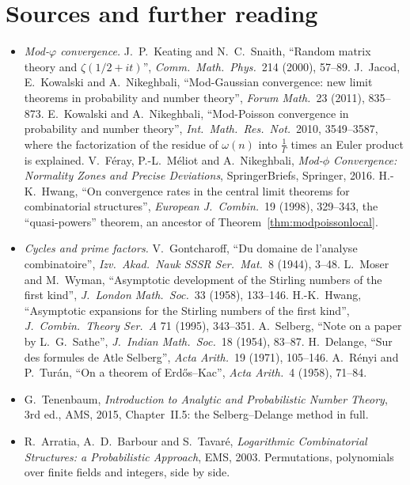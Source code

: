 \section*{Sources and further reading}

\begin{itemize}
\item \emph{Mod-$\varphi$ convergence.} J.~P.~Keating and N.~C.~Snaith, ``Random matrix theory and $\zeta(1/2+it)$'', \emph{Comm.\ Math.\ Phys.}\ 214 (2000), 57--89. J.~Jacod, E.~Kowalski and A.~Nikeghbali, ``Mod-Gaussian convergence: new limit theorems
in probability and number theory'', \emph{Forum Math.}\ 23 (2011), 835--873. E.~Kowalski and A.~Nikeghbali, ``Mod-Poisson convergence in probability and number theory'', \emph{Int.\ Math.\ Res.\ Not.}\ 2010, 3549--3587, where the factorization of the residue
of $\omega(n)$ into $\frac1\Gamma$ times an Euler product is explained. V.~F\'eray, P.-L.~M\'eliot and A.~Nikeghbali, \emph{Mod-$\phi$ Convergence: Normality Zones and Precise Deviations}, SpringerBriefs, Springer, 2016. H.-K.~Hwang, ``On convergence rates in the central limit
theorems for combinatorial structures'', \emph{European J.\ Combin.}\ 19 (1998), 329--343, the ``quasi-powers'' theorem, an ancestor of Theorem~\ref{thm:modpoissonlocal}.
\item \emph{Cycles and prime factors.} V.~Gontcharoff, ``Du domaine de l'analyse combinatoire'', \emph{Izv.\ Akad.\ Nauk SSSR Ser.\ Mat.}\ 8 (1944), 3--48. L.~Moser and M.~Wyman, ``Asymptotic development of the Stirling numbers of the first kind'', \emph{J.\ London Math.\ Soc.}\ 33 (1958), 133--146. H.-K.~Hwang, ``Asymptotic expansions for the Stirling numbers of the first kind'', \emph{J.\ Combin.\ Theory Ser.\ A} 71 (1995), 343--351.
A.~Selberg, ``Note on a paper by L.~G.~Sathe'', \emph{J.\ Indian Math.\ Soc.}\ 18 (1954), 83--87. H.~Delange, ``Sur des formules de Atle Selberg'', \emph{Acta Arith.}\ 19 (1971), 105--146. A.~R\'enyi and P.~Tur\'an, ``On a theorem of Erd\H os--Kac'', \emph{Acta Arith.}\ 4 (1958), 71--84.
\item G.~Tenenbaum, \emph{Introduction to Analytic and Probabilistic Number Theory}, 3rd ed., AMS, 2015, Chapter~II.5: the Selberg--Delange method in full.
\item R.~Arratia, A.~D.~Barbour and S.~Tavar\'e, \emph{Logarithmic Combinatorial Structures: a Probabilistic Approach}, EMS, 2003. Permutations, polynomials over finite fields and integers, side by side.
\end{itemize}
